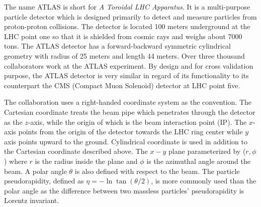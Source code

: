 The name ATLAS is short for \textit{A Toroidal LHC Apparatus}. It is a multi-purpose particle detector which is designed primarily to detect and measure particles from proton-proton collisions. The detector is located 100 meters underground at the LHC point one so that it is shielded from cosmic rays and weighs about 7000 tons. The ATLAS detector\cite{ATLASDetector} has a forward-backward symmetric cylindrical geometry with radius of 25 meters and length 44 meters. Over three thousand collaborators work at the ATLAS experiment. By design and for cross validation purpose, the ATLAS detector is very similar in regard of its functionality to its counterpart the CMS (Compact Muon Solenoid) detector at LHC point five. 

The collaboration uses a right-handed coordinate system as the convention\cite{ATLASDetector}. The Cartesian coordinate treats the beam pipe which penetrates through the detector as the $z$-axis, while the origin of which is the beam interaction point (IP). The $x$-axis points from the origin of the detector towards the LHC ring center while $y$ axis points upward to the ground. Cylindrical coordinate is used in addition to the Cartesian coordinate described above. The $x-y$ plane parameterized by ($r,\phi$) where $r$ is the radius inside the plane and $\phi$ is the azimuthal angle around the beam. A polar angle $\theta$ is also defined with respect to the beam. The particle pseudorapidity, defined as $\eta = -\ln \tan(\theta/2)$, is more commonly used than the polar angle as the difference between two massless particles' pseudorapidity is Lorentz invariant. 

